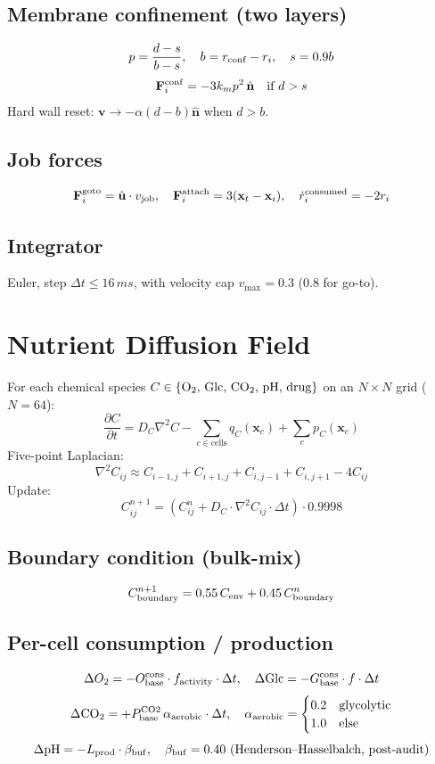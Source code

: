 \documentclass[11pt,a4paper]{article}
\newcommand{\eq}[1]{\begin{equation}#1\end{equation}}
\begin{document}
\subsection{Membrane confinement (two layers)}
\eq{ p = \frac{d-s}{b-s},\quad b=r_{\rm conf}-r_i,\quad s=0.9 b }
\eq{ \mathbf F^{\rm conf}_i = -3 k_m p^2\,\hat{\mathbf n}\quad\text{if }d>s }
Hard wall reset: $\mathbf v\to -\alpha(d-b)\hat{\mathbf n}$ when $d>b$.

\subsection{Job forces}
\[ \mathbf F^{\rm goto}_i = \hat{\mathbf u}\cdot v_{\rm job},\quad \mathbf F^{\rm attach}_i = 3(\mathbf x_t-\mathbf x_i),\quad \dot r_i^{\rm consumed}=-2 r_i \]

\subsection{Integrator}
Euler, step $\Delta t \le 16\,\si{ms}$, with velocity cap $v_{\max}=0.3$ (0.8 for go-to).

\clearpage
\section{Nutrient Diffusion Field}
\label{sec:nutrients}

For each chemical species $C\in\{\rm O_2,\,Glc,\,CO_2,\,pH,\,drug\}$ on an $N\times N$ grid ($N=64$):
\eq{ \frac{\partial C}{\partial t} = D_C\nabla^2 C - \sum_{c\in\text{cells}}q_C(\mathbf x_c) + \sum_{c}p_C(\mathbf x_c) }
Five-point Laplacian:
\eq{ \nabla^2 C_{ij}\approx C_{i-1,j}+C_{i+1,j}+C_{i,j-1}+C_{i,j+1}-4 C_{ij} }
Update:
\eq{ C_{ij}^{n+1} = (C_{ij}^n + D_C\cdot\nabla^2 C_{ij}\cdot \Delta t)\cdot 0.9998 }

\subsection{Boundary condition (bulk-mix)}
\eq{ C_{\rm boundary}^{n+1} = 0.55\,C_{\rm env}+0.45\,C_{\rm boundary}^{n} }

\subsection{Per-cell consumption / production}
\eq{ \Delta O_2 = -O^{\rm cons}_{\rm base}\cdot f_{\rm activity}\cdot\Delta t,\quad \Delta {\rm Glc} = -G^{\rm cons}_{\rm base}\cdot f\cdot\Delta t }
\eq{ \Delta\mathrm{CO}_2=+P^{\rm CO2}_{\rm base}\,\alpha_{\rm aerobic}\cdot\Delta t,\quad \alpha_{\rm aerobic}=\begin{cases}0.2 & \text{glycolytic}\\1.0 & \text{else}\end{cases} }
\eq{ \Delta\mathrm{pH}=-L_{\rm prod}\cdot\beta_{\rm buf},\quad \beta_{\rm buf}=0.40\ (\text{Henderson--Hasselbalch, post-audit}) }
\end{document}
